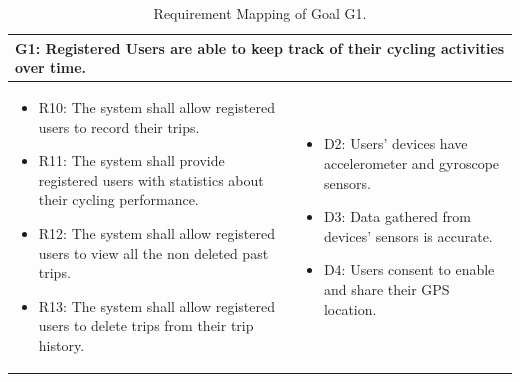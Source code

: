 \begin{table}[H]
    \begin{tabularx}{\textwidth}{|X|X|}
        \hline
        \multicolumn{2}{|l|}{G1: Registered Users are able to keep track of their cycling activities over time.}  \\ \hline
        \begin{itemize}[topsep=0pt, partopsep=0pt, leftmargin=*]
            \item R10: The system shall allow registered users to record their trips.
            \item R11: The system shall provide registered users with statistics about their cycling performance.
            \item R12: The system shall allow registered users to view all the non deleted past trips.
            \item R13: The system shall allow registered users to delete trips from their trip history.
        \end{itemize} & \begin{itemize}[topsep=0pt, partopsep=0pt, leftmargin=*]
            \item D2: Users’ devices have accelerometer and gyroscope sensors.
            \item D3: Data gathered from devices’ sensors is accurate.
            \item D4: Users consent to enable and share their GPS location.
        \end{itemize} \\ \hline
    \end{tabularx}
    \caption{Requirement Mapping of Goal G1.}
    \label{tab:rm_g1}
\end{table}

